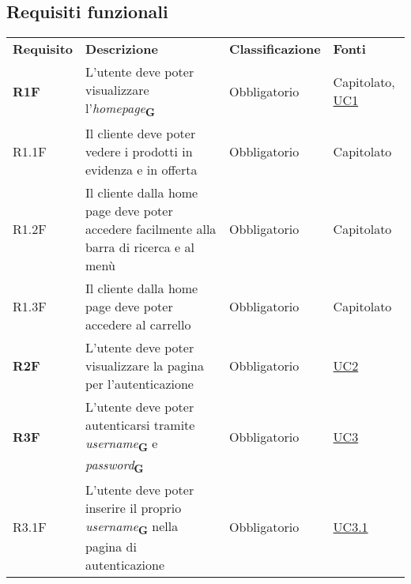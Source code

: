 \newpage
\subsection{Requisiti funzionali}
\begin{center}
    \centering
    \renewcommand{\arraystretch}{1.8}
    \label{tab:RequisitiFunzionali}
    \begin{longtable}[!h]{p{50px} p{245px} p{75px} p{50px}}
        \rowcolor{logo!70} \textbf{Requisito} & \textbf{Descrizione}                                                                                                               & \textbf{Classificazione} & \textbf{Fonti}                               \\
        \textbf{R1F}                          & L'utente deve poter visualizzare l'\textit{homepage}\textsubscript{\textbf{G}}                                                     & Obbligatorio             & Capitolato, \newline \hyperref[sec:UC1]{UC1} \\
        R1.1F                                 & Il cliente deve poter vedere i prodotti in evidenza e in offerta                                                                   & Obbligatorio             & Capitolato                                   \\
        R1.2F                                 & Il cliente dalla home page deve poter accedere facilmente alla barra di ricerca e al menù                                          & Obbligatorio             & Capitolato                                   \\
        R1.3F                                 & Il cliente dalla home page deve poter accedere al carrello                                                                         & Obbligatorio             & Capitolato                                   \\
        \textbf{R2F}                          & L'utente deve poter visualizzare la pagina per l'autenticazione                                                                    & Obbligatorio             & \hyperref[sec:UC2]{UC2}                      \\
        \textbf{R3F}                          & L'utente deve poter autenticarsi tramite \textit{username}\textsubscript{\textbf{G}} e \textit{password}\textsubscript{\textbf{G}} & Obbligatorio             & \hyperref[sec:UC3]{UC3}                      \\
        R3.1F                                 & L'utente deve poter inserire il proprio \textit{username}\textsubscript{\textbf{G}} nella pagina di autenticazione                 & Obbligatorio             & \hyperref[sec:UC3.1]{UC3.1}                  \\

\end{longtable}
\end{center}
